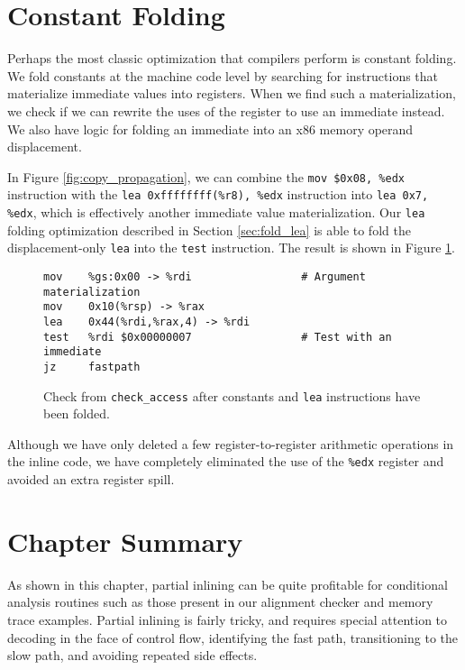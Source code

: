 \section{Constant Folding}

Perhaps the most classic optimization that compilers perform is constant
folding.  We fold constants at the machine code level by searching for
instructions that materialize immediate values into registers.  When we find
such a materialization, we check if we can rewrite the uses of the register to
use an immediate instead.  We also have logic for folding an immediate into an
x86 memory operand displacement.

In Figure \ref{fig:copy_propagation}, we can combine the {\tt mov \$0x08, \%edx}
instruction with the {\tt lea 0xffffffff(\%r8), \%edx} instruction into {\tt lea
0x7, \%edx}, which is effectively another immediate value materialization.  Our
{\tt lea} folding optimization described in Section \ref{sec:fold_lea} is able
to fold the displacement-only {\tt lea} into the {\tt test} instruction.  The
result is shown in Figure \ref{fig:fold_immediate}.

\begin{figure}
\begin{verbatim}
mov    %gs:0x00 -> %rdi                 # Argument materialization
mov    0x10(%rsp) -> %rax
lea    0x44(%rdi,%rax,4) -> %rdi
test   %rdi $0x00000007                 # Test with an immediate
jz     fastpath
\end{verbatim}
\caption{Check from {\tt check\_access} after constants and {\tt lea}
instructions have been folded.}
\label{fig:fold_immediate}
\end{figure}

Although we have only deleted a few register-to-register arithmetic operations
in the inline code, we have completely eliminated the use of the {\tt \%edx}
register and avoided an extra register spill.

\section{Chapter Summary}

As shown in this chapter, partial inlining can be quite profitable for
conditional analysis routines such as those present in our alignment checker and
memory trace examples.  Partial inlining is fairly tricky, and requires special
attention to decoding in the face of control flow, identifying the fast path,
transitioning to the slow path, and avoiding repeated side effects.

